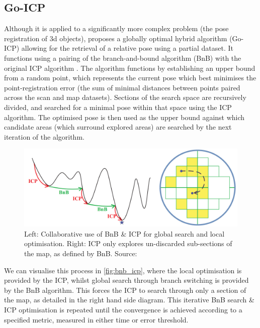 \documentclass[authoryearcitations]{UoYCSproject}
\begin{document}
\subsection{Go-ICP}
\label{subsec:go_icp}
Although it is applied to a significantly more complex problem (the pose registration of 3d objects), \citet{Yang2013-gx} proposes a globally optimal hybrid algorithm (Go-ICP) allowing for the retrieval of a relative pose using a partial dataset. It functions using a pairing of the branch-and-bound algorithm (BnB) \cite{Land1960-yw} with the original ICP algorithm \cite{Besl1992-pd}. The algorithm functions by establishing an upper bound from a random point, which represents the current pose which best minimises the point-registration error (the sum of minimal distances between points paired across the scan and map datasets). Sections of the search space are recursively divided, and searched for a minimal pose within that space using the ICP algorithm. The optimised pose is then used as the upper bound against which candidate areas (which surround explored areas) are searched by the next iteration of the algorithm. \newline

\begin{figure}[ht]
	\centering
	\includegraphics[width=12cm,keepaspectratio]{images/BnBICP.png}
	\caption[Combining Branch-and-Bound with ICP]{Left: Collaborative use of BnB \& ICP for global search and local optimisation. Right: ICP only explores un-discarded sub-sections of the map, as defined by BnB. Source: \citet{Yang2013-gx}}
	\label{fig:bnb_icp}
\end{figure}

We can visualise this process in \autoref{fig:bnb_icp}, where the local optimisation is provided by the ICP, whilst global search through branch switching is provided by the BnB algorithm. This forces the ICP to search through only a section of the map, as detailed in the right hand side diagram. This iterative BnB search \& ICP optimisation is repeated until the convergence is achieved according to a specified metric, measured in either time or error threshold. \newline
\end{document}
